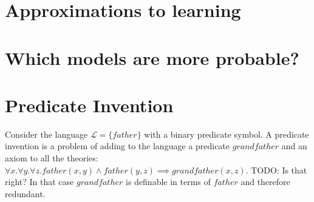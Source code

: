 \section{Approximations to learning}
\section{Which models are more probable?}
\section{Predicate Invention}
Consider the language $\mathcal{L}=\{father\}$ with a binary predicate symbol. A predicate invention is a problem of adding to the language a predicate $grandfather$ and an axiom to all the theories: $\forall x. \forall y. \forall z. father(x,y) \wedge father(y,z) \implies grandfather(x,z)$.
TODO: Is that right? In that case $grandfather$ is definable in terms of $father$ and therefore redundant.
\fi

\iffalse
\section{Foundations of inductive reasoning}
Let $A$ be a set of objects on which the observations can be applied, $\mathcal{P}$ be a set of the properties that can be observed on $a \in A$. Then an observation $O$ of an element $a \in A$ is a minimal set of the literals such that
$\forall P \in \mathcal{P}. P(a) \in O \vee \neg P(a) \in O$.
\fi